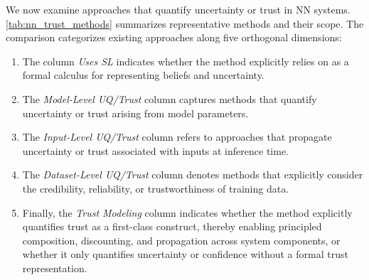 We now examine approaches that quantify uncertainty or trust in \ac{NN} systems. \cref{tab:nn_trust_methods} summarizes representative methods and their scope. The comparison categorizes existing approaches along five orthogonal dimensions:
\begin{enumerate}
    \item The column \emph{Uses SL} indicates whether the method explicitly relies on  as a formal calculus for representing beliefs and uncertainty.
    \item The \emph{Model-Level UQ/Trust} column captures methods that quantify uncertainty or trust arising from model parameters.
    \item The \emph{Input-Level UQ/Trust} column refers to approaches that propagate uncertainty or trust associated with inputs at inference time.
    \item The \emph{Dataset-Level UQ/Trust} column denotes methods that explicitly consider the credibility, reliability, or trustworthiness of training data.
    \item Finally, the \emph{Trust Modeling} column indicates whether the method explicitly quantifies trust as a first-class construct, thereby enabling principled composition, discounting, and propagation across system components, or whether it only quantifies uncertainty or confidence without a formal trust representation.
\end{enumerate}
   
